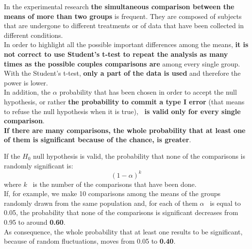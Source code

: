 
\begin{frame}
  \begin{small}
    \vspace*{.1cm}
    In the experimental research \textbf{the simultaneous comparison between the means of more than two groups} is frequent. They are composed of subjects that are undergone to different treatments or of data that have been collected in different conditions.\\
    \vspace*{.1cm}
    In order to highlight all the possible important differences among the means, \textbf{it is not correct to use Student's t-test to repeat the analysis as many times as the possible couples comparisons are} among every single group.\\
    \vspace*{.1cm}
    With the Student's t-test, \textbf{only a part of the data is used} and therefore the power is lower.\\
    \vspace*{.1cm}
    In addition, the $ \alpha $ probability that has been chosen in order to accept the null hypothesis, or rather \textbf{the probability to commit a type I error} (that means to refuse the null hypothesis when it is true), \textbf{\ is valid only for every single comparison}.\\
    \vspace*{.1cm}
    \textbf{If there are many comparisons, the whole probability that at least one of them is significant because of the chance, is greater}.
  \end{small}
\end{frame}

\begin{frame}
  \vspace*{.25cm}
  If the $ H_0 $ null hypothesis is valid, the probability that none of the comparisons is randomly significant is:
  $$ (1-\alpha)^k $$
  where $ k $ \ is the number of the comparisons that have been done.\\
  \vspace*{.5cm}
  If, for example, we make 10 comparisons among the means of the groups randomly drawn from the same population and, for each of them $ \alpha $ \ is equal to 0.05, the probability that none of the comparisons is significant decreases from 0.95 to around \textbf{0.60}.\\
  \vspace*{.5cm}
  As consequence, the whole probability that at least one results to be significant, because of random fluctuations, moves from 0.05 to \textbf{0.40}.
\end{frame}

